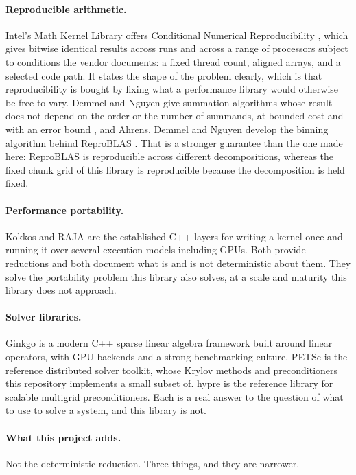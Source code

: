 \paragraph{Reproducible arithmetic.} Intel's Math Kernel Library offers
Conditional Numerical Reproducibility \cite{mklcnr}, which gives bitwise
identical results across runs and across a range of processors subject to
conditions the vendor documents: a fixed thread count, aligned arrays, and a
selected code path. It states the shape of the problem clearly, which is that
reproducibility is bought by fixing what a performance library would otherwise
be free to vary. Demmel and Nguyen give summation algorithms whose result does
not depend on the order or the number of summands, at bounded cost and with an
error bound \cite{demmel2013,demmel2015}, and Ahrens, Demmel and Nguyen develop
the binning algorithm behind ReproBLAS \cite{ahrens2020}. That is a stronger
guarantee than the one made here: ReproBLAS is reproducible across different
decompositions, whereas the fixed chunk grid of this library is reproducible
because the decomposition is held fixed.

\paragraph{Performance portability.} Kokkos
\cite{edwards2014,trott2022} and RAJA \cite{beckingsale2019} are the established
C++ layers for writing a kernel once and running it over several execution
models including GPUs. Both provide reductions and both document what is and is
not deterministic about them. They solve the portability problem this library
also solves, at a scale and maturity this library does not approach.

\paragraph{Solver libraries.} Ginkgo \cite{anzt2022} is a modern C++ sparse
linear algebra framework built around linear operators, with GPU backends and a
strong benchmarking culture. PETSc \cite{balay1997,petsc2026} is the reference
distributed solver toolkit, whose Krylov methods and preconditioners this
repository implements a small subset of. hypre \cite{falgout2002} is the
reference library for scalable multigrid preconditioners. Each is a real answer
to the question of what to use to solve a system, and this library is not.

\paragraph{What this project adds.} Not the deterministic reduction. Three
things, and they are narrower.

